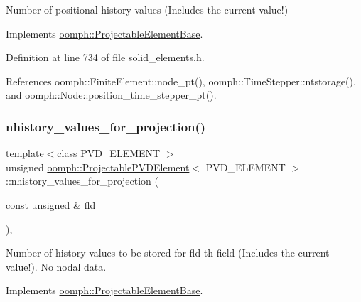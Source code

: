 Number of positional history values (Includes the current value!) 



Implements \hyperlink{classoomph_1_1ProjectableElementBase_ab4ecd0cd24000a3ed675dc7198203c1f}{oomph\+::\+Projectable\+Element\+Base}.



Definition at line 734 of file solid\+\_\+elements.\+h.



References oomph\+::\+Finite\+Element\+::node\+\_\+pt(), oomph\+::\+Time\+Stepper\+::ntstorage(), and oomph\+::\+Node\+::position\+\_\+time\+\_\+stepper\+\_\+pt().

\mbox{\label{classoomph_1_1ProjectablePVDElement_a1fe76f1370f13c75f81f8dc860240084}} 
\subsubsection{\texorpdfstring{nhistory\+\_\+values\+\_\+for\+\_\+projection()}{nhistory\_values\_for\_projection()}}
{\footnotesize\ttfamily template$<$class P\+V\+D\+\_\+\+E\+L\+E\+M\+E\+NT $>$ \\
unsigned \hyperlink{classoomph_1_1ProjectablePVDElement}{oomph\+::\+Projectable\+P\+V\+D\+Element}$<$ P\+V\+D\+\_\+\+E\+L\+E\+M\+E\+NT $>$\+::nhistory\+\_\+values\+\_\+for\+\_\+projection (\begin{DoxyParamCaption}\item[{const unsigned \&}]{fld }\end{DoxyParamCaption})\hspace{0.3cm}{\ttfamily [inline]}, {\ttfamily [virtual]}}



Number of history values to be stored for fld-\/th field (Includes the current value!). No nodal data. 



Implements \hyperlink{classoomph_1_1ProjectableElementBase_ac6790f394630b964663281f8740f43a5}{oomph\+::\+Projectable\+Element\+Base}.



